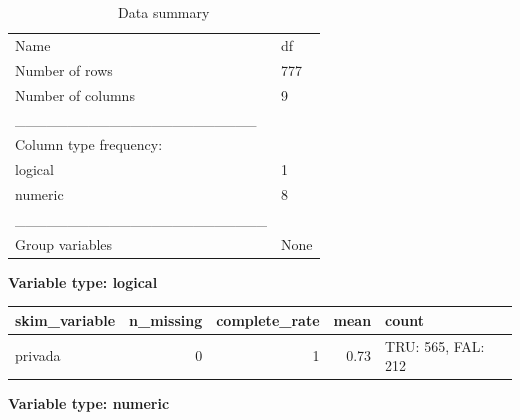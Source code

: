 \documentclass[
  letterpaper,
  DIV=11,
  numbers=noendperiod]{scrartcl}
\begin{document}
\begin{longtable}[]{@{}ll@{}}
\caption{Data summary}\tabularnewline
\toprule\noalign{}
\endfirsthead
\endhead
\bottomrule\noalign{}
\endlastfoot
Name & df \\
Number of rows & 777 \\
Number of columns & 9 \\
\_\_\_\_\_\_\_\_\_\_\_\_\_\_\_\_\_\_\_\_\_\_\_ & \\
Column type frequency: & \\
logical & 1 \\
numeric & 8 \\
\_\_\_\_\_\_\_\_\_\_\_\_\_\_\_\_\_\_\_\_\_\_\_\_ & \\
Group variables & None \\
\end{longtable}

\textbf{Variable type: logical}

\begin{longtable}[]{@{}lrrrl@{}}
\toprule\noalign{}
skim\_variable & n\_missing & complete\_rate & mean & count \\
\midrule\noalign{}
\endhead
\bottomrule\noalign{}
\endlastfoot
privada & 0 & 1 & 0.73 & TRU: 565, FAL: 212 \\
\end{longtable}

\textbf{Variable type: numeric}
\end{document}
